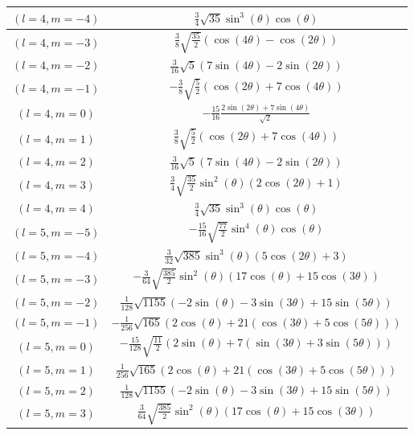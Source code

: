 \begin{center}
\begin{longtable}{|c|c|}
$(l=4, m=-4)$ & $\frac{3}{4} \sqrt{35} \sin ^3(\theta ) \cos (\theta )$ \\ \hline
\rowcolor{gray!15}
$(l=4, m=-3)$ & $\frac{3}{8} \sqrt{\frac{35}{2}} (\cos (4 \theta )-\cos (2 \theta ))$ \\ \hline
$(l=4, m=-2)$ & $\frac{3}{16} \sqrt{5} (7 \sin (4 \theta )-2 \sin (2 \theta ))$ \\ \hline
\rowcolor{gray!15}
$(l=4, m=-1)$ & $-\frac{3}{8} \sqrt{\frac{5}{2}} (\cos (2 \theta )+7 \cos (4 \theta ))$ \\ \hline
$(l=4, m=0)$ & $-\frac{15}{16} \frac{2 \sin (2 \theta )+7 \sin (4 \theta )}{\sqrt{2}}$ \\ \hline
\rowcolor{gray!15}
$(l=4, m=1)$ & $\frac{3}{8} \sqrt{\frac{5}{2}} (\cos (2 \theta )+7 \cos (4 \theta ))$ \\ \hline
$(l=4, m=2)$ & $\frac{3}{16} \sqrt{5} (7 \sin (4 \theta )-2 \sin (2 \theta ))$ \\ \hline
\rowcolor{gray!15}
$(l=4, m=3)$ & $\frac{3}{4} \sqrt{\frac{35}{2}} \sin ^2(\theta ) (2 \cos (2 \theta )+1)$ \\ \hline
$(l=4, m=4)$ & $\frac{3}{4} \sqrt{35} \sin ^3(\theta ) \cos (\theta )$ \\ \hline
\rowcolor{gray!15}
$(l=5, m=-5)$ & $-\frac{15}{16} \sqrt{\frac{77}{2}} \sin ^4(\theta ) \cos (\theta )$ \\ \hline
$(l=5, m=-4)$ & $\frac{3}{32} \sqrt{385} \sin ^3(\theta ) (5 \cos (2 \theta )+3)$ \\ \hline
\rowcolor{gray!15}
$(l=5, m=-3)$ & $-\frac{3}{64} \sqrt{\frac{385}{2}} \sin ^2(\theta ) (17 \cos (\theta )+15 \cos (3 \theta ))$ \\ \hline
$(l=5, m=-2)$ & $\frac{1}{128} \sqrt{1155} (-2 \sin (\theta )-3 \sin (3 \theta )+15 \sin (5 \theta ))$ \\ \hline
\rowcolor{gray!15}
$(l=5, m=-1)$ & $-\frac{1}{256} \sqrt{165} (2 \cos (\theta )+21 (\cos (3 \theta )+5 \cos (5 \theta )))$ \\ \hline
$(l=5, m=0)$ & $-\frac{15}{128} \sqrt{\frac{11}{2}} (2 \sin (\theta )+7 (\sin (3 \theta )+3 \sin (5 \theta )))$ \\ \hline
\rowcolor{gray!15}
$(l=5, m=1)$ & $\frac{1}{256} \sqrt{165} (2 \cos (\theta )+21 (\cos (3 \theta )+5 \cos (5 \theta )))$ \\ \hline
$(l=5, m=2)$ & $\frac{1}{128} \sqrt{1155} (-2 \sin (\theta )-3 \sin (3 \theta )+15 \sin (5 \theta ))$ \\ \hline
\rowcolor{gray!15}
$(l=5, m=3)$ & $\frac{3}{64} \sqrt{\frac{385}{2}} \sin ^2(\theta ) (17 \cos (\theta )+15 \cos (3 \theta ))$ \\ \hline

\end{longtable}
\end{center}
